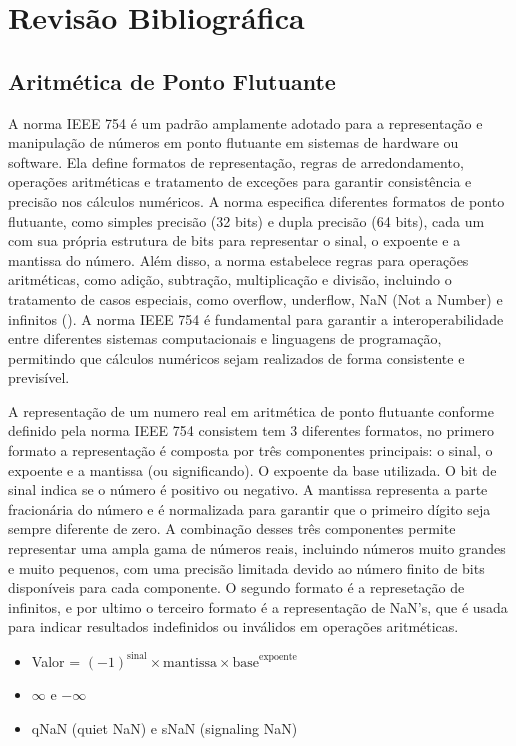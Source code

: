 
\section{Revisão Bibliográfica}



\subsection{Aritmética de Ponto Flutuante}
A norma IEEE 754 é um padrão amplamente adotado para a representação e manipulação de números em ponto flutuante em sistemas de hardware ou software. Ela define formatos de representação, regras de arredondamento, operações aritméticas e tratamento de exceções para garantir consistência e precisão nos cálculos numéricos. A norma especifica diferentes formatos de ponto flutuante, como simples precisão (32 bits) e dupla precisão (64 bits), cada um com sua própria estrutura de bits para representar o sinal, o expoente e a mantissa do número. Além disso, a norma estabelece regras para operações aritméticas, como adição, subtração, multiplicação e divisão, incluindo o tratamento de casos especiais, como overflow, underflow, NaN (Not a Number) e infinitos (\cite{IEEE754_2019}). A norma IEEE 754 é fundamental para garantir a interoperabilidade entre diferentes sistemas computacionais e linguagens de programação, permitindo que cálculos numéricos sejam realizados de forma consistente e previsível.

A representação de um numero real em aritmética de ponto flutuante conforme definido pela norma IEEE 754 consistem tem 3 diferentes formatos, no primero formato a representação é composta por três componentes principais: o sinal, o expoente e a mantissa (ou significando). O expoente da base utilizada. O bit de sinal indica se o número é positivo ou negativo. A mantissa representa a parte fracionária do número e é normalizada para garantir que o primeiro dígito seja sempre diferente de zero. A combinação desses três componentes permite representar uma ampla gama de números reais, incluindo números muito grandes e muito pequenos, com uma precisão limitada devido ao número finito de bits disponíveis para cada componente. O segundo formato é a represetação de infinitos, e por ultimo o terceiro formato é a representação de NaN's, que é usada para indicar resultados indefinidos ou inválidos em operações aritméticas.
\begin{itemize}
    \item Valor = $(-1)^{\text{sinal}} \times \text{mantissa} \times \text{base}^{\text{expoente}}$
    \item $\infty$ e $-\infty$
    \item qNaN (quiet NaN) e sNaN (signaling NaN)
\end{itemize}

